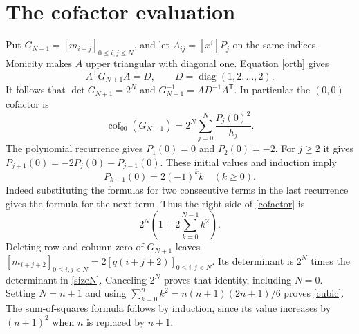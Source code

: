 \documentclass[11pt]{article}
\begin{document}
\section{The cofactor evaluation}
Put $G_{N+1}=[m_{i+j}]_{0\leq i,j\leq N}$, and let
$A_{ij}=[x^i]P_j$ on the same indices. Monicity makes $A$ upper
triangular with diagonal one. Equation \eqref{orth} gives
\[
A^{\mathsf T}G_{N+1}A=D,\qquad
D=\operatorname{diag}(1,2,\ldots,2).
\]
It follows that $\det G_{N+1}=2^N$ and
$G_{N+1}^{-1}=AD^{-1}A^{\mathsf T}$. In particular the
$(0,0)$ cofactor is
\begin{equation}\label{cofactor}
\operatorname{cof}_{00}(G_{N+1})
 =2^N\sum_{j=0}^N\frac{P_j(0)^2}{h_j}.
\end{equation}
The polynomial recurrence gives $P_1(0)=0$ and $P_2(0)=-2$.
For $j\geq2$ it gives $P_{j+1}(0)=-2P_j(0)-P_{j-1}(0)$.
These initial values and induction imply
\begin{equation}\label{constant}
P_{k+1}(0)=2(-1)^k k\quad(k\geq0).
\end{equation}
Indeed substituting the formulas for two consecutive terms in
the last recurrence gives the formula for the next term.
Thus the right side of \eqref{cofactor} is
\[
2^N\left(1+2\sum_{k=0}^{N-1}k^2\right).
\]
Deleting row and column zero of $G_{N+1}$ leaves
$[m_{i+j+2}]_{0\leq i,j<N}=2[q(i+j+2)]_{0\leq i,j<N}$.
Its determinant is $2^N$ times the determinant in \eqref{sizeN}.
Canceling $2^N$ proves that identity, including $N=0$.
Setting $N=n+1$ and using
$\sum_{k=0}^n k^2=n(n+1)(2n+1)/6$ proves \eqref{cubic}.
The sum-of-squares formula follows by induction, since its value
increases by $(n+1)^2$ when $n$ is replaced by $n+1$.
\end{document}
